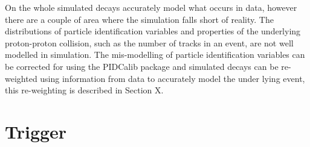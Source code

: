 On the whole simulated decays accurately model what occurs in data, however there are a couple of area where the simulation falls short of reality.
The distributions of particle identification variables and properties of the underlying proton-proton collision, such as the number of tracks in an event, are not well modelled in simulation. %
The mis-modelling of particle identification variables can be corrected for using the PIDCalib package and simulated decays can be re-weighted using information from data to accurately model the under lying event, this re-weighting is described in Section X. 


\section{Trigger}
\label{sec:triggerRequirements}


